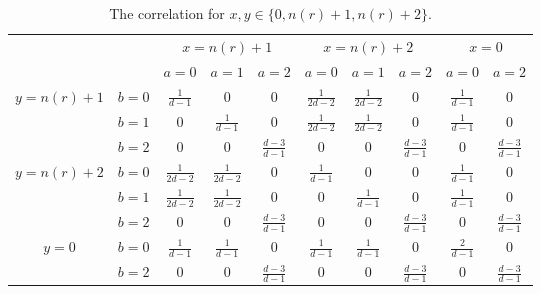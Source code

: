 \documentclass[11pt,letterpaper]{article}
\newcommand{\1}{\mathbb{1}}
\newcommand{\nr}{n(r)}
\theoremstyle{definition}
\begin{document}
\begin{table}[H]
\begin{center}
\begin{tabular}{|c|c||c|c|c|c|c|c|c|c|}
\hline
\multicolumn{2}{|c|}{} &
\multicolumn{3}{|c|}{$x=\nr+1$}&
\multicolumn{3}{|c|}{$x=\nr+2$}&
\multicolumn{2}{|c|}{$x=0$}\\
\cline{3-10}
\multicolumn{2}{|c|}{} &
$a = 0$ & $a=1$ & $a=2$ &
$a = 0$ & $a=1$ & $a=2$ &
$a = 0$ & $a =2 $\\
\hline
\hline
\multirow{3}{*}{$y = \nr+1$} & $b=0$ & $\frac{1}{d-1}$ & $0$ & 0 
& $\frac{1}{2d-2}$ & $\frac{1}{2d-2}$ & 0 & $\frac{1}{d-1}$ & 0 \\
\cline{2-10}
&$b=1$ & 0 & $\frac{1}{d-1}$ & $0$ 
&  $\frac{1}{2d-2}$ & $\frac{1}{2d-2}$ & 0 &$\frac{1}{d-1}$ & 0 \\
\cline{2-10}
&$b=2$ & 0 & 0 & $\frac{d-3}{d-1}$ 
&  0 & 0 &  $\frac{d-3}{d-1} $ &0 & $\frac{d-3}{d-1}$ \\
\hline
\multirow{3}{*}{$y = \nr+2$} & $b=0$ & $\frac{1}{2d-2}$ & $\frac{1}{2d-2}$ & 0 
& $\frac{1}{d-1}$ & $0$ & 0 & $\frac{1}{d-1}$ & 0 \\
\cline{2-10}
&$b=1$ & $\frac{1}{2d-2}$ & $\frac{1}{2d-2}$ & $0$ 
&  0 & $\frac{1}{d-1}$ & $0$ &$\frac{1}{d-1}$ & 0 \\
\cline{2-10}
&$b=2$ & 0 & 0 & \small $\frac{d-3}{d-1}$ 
&  0 & 0 & \small $\frac{d-3}{d-1} $ &0 &\small $\frac{d-3}{d-1}$ \\
\hline
\multirow{2}{*}{$y = 0$} & $b=0$ & $\frac{1}{d-1}$ & $\frac{1}{d-1}$ & 0 
& $\frac{1}{d-1}$ & $\frac{1}{d-1}$ & 0 & $\frac{2}{d-1}$ & 0 \\
\cline{2-10}
&$b=2$ & 0 & 0 & $\frac{d-3}{d-1}$ 
&  0 & 0 & \small $\frac{d-3}{d-1} $ &0 & \small $\frac{d-3}{d-1}$ \\
\hline
\end{tabular}
\end{center}
\caption{The correlation for $x ,y\in\{0, \nr+1,\nr+2\} $.}
\end{table}
\end{document}
